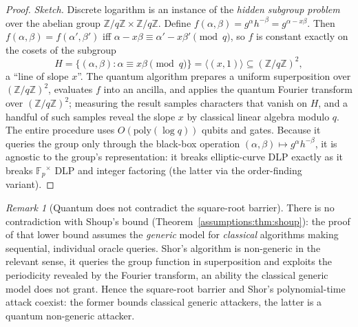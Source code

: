 \documentclass[11pt,a4paper]{article}
\theoremstyle{definition}
\theoremstyle{remark}
\newtheorem{remark}[theorem]{Remark}
\newcommand{\Z}{\ensuremath{\mathbb{Z}}}
\newcommand{\Fp}{\ensuremath{\mathbb{F}_{p}}}
\begin{document}
\begin{proof}
\emph{Sketch.} Discrete logarithm is an instance of the \emph{hidden subgroup problem} over the abelian group \(\Z/q\Z \times \Z/q\Z\). Define \(f(\alpha,\beta) = g^{\alpha} h^{-\beta} = g^{\alpha - x\beta}\). Then \(f(\alpha,\beta) = f(\alpha',\beta')\) iff \(\alpha - x\beta \equiv \alpha' - x\beta' \pmod q\), so \(f\) is constant exactly on the cosets of the subgroup
\[
H = \{(\alpha,\beta) : \alpha \equiv x\beta \pmod q\} = \langle (x,1)\rangle \subseteq (\Z/q\Z)^2 ,
\]
a ``line of slope \(x\)''. The quantum algorithm prepares a uniform superposition over \((\Z/q\Z)^2\), evaluates \(f\) into an ancilla, and applies the quantum Fourier transform over \((\Z/q\Z)^2\); measuring the result samples characters that vanish on \(H\), and a handful of such samples reveal the slope \(x\) by classical linear algebra modulo \(q\). The entire procedure uses \(O(\mathrm{poly}(\log q))\) qubits and gates. Because it queries the group only through the black-box operation \((\alpha,\beta)\mapsto g^{\alpha}h^{-\beta}\), it is agnostic to the group's representation: it breaks elliptic-curve DLP exactly as it breaks \(\Fp^\times\) DLP and integer factoring (the latter via the order-finding variant).
\end{proof}

\begin{remark}[Quantum does not contradict the square-root barrier]
\label{assumptions:rem:no-contradiction}
There is no contradiction with Shoup's bound (Theorem~\ref{assumptions:thm:shoup}): the proof of that lower bound assumes the \emph{generic} model for \emph{classical} algorithms making sequential, individual oracle queries. Shor's algorithm is non-generic in the relevant sense, it queries the group function in superposition and exploits the periodicity revealed by the Fourier transform, an ability the classical generic model does not grant. Hence the square-root barrier and Shor's polynomial-time attack coexist: the former bounds classical generic attackers, the latter is a quantum non-generic attacker.
\end{remark}
\end{document}
